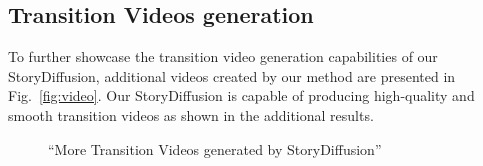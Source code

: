 \documentclass{article} %
\newcommand{\nameofmethod}{StoryDiffusion}
\renewcommand{\figref}[1]{Fig.~\ref{#1}}
\begin{document}
\subsection{Transition Videos generation}
To further showcase the transition video generation capabilities of our \nameofmethod{}, additional videos created by our method are presented in \figref{fig:video}. Our \nameofmethod{} is capable of producing high-quality and smooth transition videos as shown in the additional results.

\begin{figure}[!]
\small
\centering
    \begin{minipage}[t]{0.98\textwidth}
    \centering ``More Transition Videos generated by \nameofmethod{}''
          \vspace{2pt}
    \end{minipage}
    \begin{minipage}[t]{0.20\textwidth}
    \end{minipage}
    \begin{minipage}[t]{0.20\textwidth}
    \end{minipage}
    \begin{minipage}[t]{0.20\textwidth}
    \end{minipage}
    \begin{minipage}[t]{0.20\textwidth}
    \end{minipage}
    
    \begin{minipage}[t]{0.20\textwidth}
    \end{minipage}
    \begin{minipage}[t]{0.20\textwidth}
    \end{minipage}
    \begin{minipage}[t]{0.20\textwidth}
    \end{minipage}
    \begin{minipage}[t]{0.20\textwidth}
    \end{minipage}
    

\end{figure}
\end{document}
